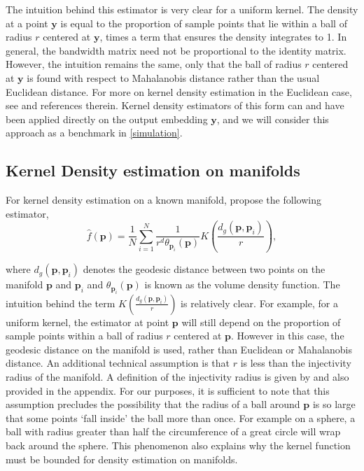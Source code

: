 \documentclass[11pt,a4paper,]{article}
\begin{document}
The intuition behind this estimator is very clear for a uniform kernel. The density at a point \(\pmb{y}\) is equal to the proportion of sample points that lie within a ball of radius \(r\) centered at \(\pmb{y}\), times a term that ensures the density integrates to 1. In general, the bandwidth matrix need not be proportional to the identity matrix. However, the intuition remains the same, only that the ball of radius \(r\) centered at \(\pmb{y}\) is found with respect to Mahalanobis distance rather than the usual Euclidean distance. For more on kernel density estimation in the Euclidean case, see \textcite{Scott2015-vl} and references therein. Kernel density estimators of this form can and have been applied directly on the output embedding \(\pmb{y}\), and we will consider this approach as a benchmark in \autoref{simulation}.

\hypertarget{Pellet}{%
\subsection{Kernel Density estimation on manifolds}\label{Pellet}}

For kernel density estimation on a known manifold, \textcite{Pelletier2005-vu} propose the following estimator,
\begin{equation}
\label{eq:denriem}
\hat{f}(\pmb{p}) = \frac{1}{N} \sum_{i=1}^{N} \frac{1}{r^d \theta_{\pmb{p}_i}(\pmb{p})} K\left(\frac{d_g(\pmb{p}, \pmb{p}_i)}{r}\right),
\end{equation}

where \(d_g(\pmb{p}, \pmb{p}_i)\) denotes the geodesic distance between two points on the manifold \(\pmb{p}\) and \(\pmb{p}_i\) and \(\theta_{\pmb{p}_i}(\pmb{p})\) is known as the volume density function. The intuition behind the term \(K\left(\frac{d_g(\pmb{p}, \pmb{p}_i)}{r}\right)\) is relatively clear. For example, for a uniform kernel, the estimator at point \(\pmb{p}\) will still depend on the proportion of sample points within a ball of radius \(r\) centered at \(\pmb{p}\). However in this case, the geodesic distance on the manifold is used, rather than Euclidean or Mahalanobis distance. An additional technical assumption is that \(r\) is less than the injectivity radius of the manifold. A definition of the injectivity radius is given by \textcite{Chavel2006-mp} and also provided in the appendix. For our purposes, it is sufficient to note that this assumption precludes the possibility that the radius of a ball around \(\pmb{p}\) is so large that some points `fall inside' the ball more than once. For example on a sphere, a ball with radius greater than half the circumference of a great circle will wrap back around the sphere. This phenomenon also explains why the kernel function must be bounded for density estimation on manifolds.
\end{document}
